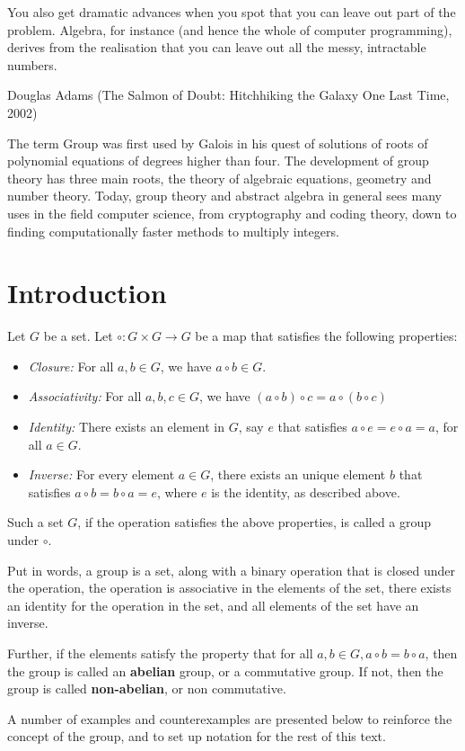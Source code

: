 \epigraph{You also get dramatic advances when you spot that you can leave out part of the problem. Algebra, for instance (and hence the whole of computer programming), derives from the realisation that you can leave out all the messy, intractable numbers.}{Douglas Adams (The Salmon of Doubt: Hitchhiking the Galaxy One Last Time, 2002)}
\par
The term Group was first used by Galois in his quest of solutions of roots of polynomial equations of degrees higher than four.
The development of group theory has three main roots, the theory of algebraic equations, geometry and number theory.
Today, group theory and abstract algebra in general sees many uses in the field computer science, from cryptography and coding theory, down to finding computationally faster methods to multiply integers.
\section{Introduction}
\begin{definition} \label{def:group}
  Let $G$ be a set.
  Let $ \circ : G \times G \rightarrow G $  be a map that satisfies the following properties:
  \begin{itemize}
    \item \textit{Closure:} For all $a, b \in G$, we have $a \circ b \in G$.
    \item \textit{Associativity:} For all $a, b, c \in G$, we have $(a \circ b) \circ c = a \circ (b \circ c)$
    \item \textit{Identity:} There exists an element in $G$, say $e$ that satisfies $a \circ e = e \circ a = a$, for all $a \in G$.
    \item \textit{Inverse:} For every element $a \in G$, there exists an unique element $b$ that satisfies $a \circ b = b \circ a = e$, where $e$ is the identity, as described above.
  \end{itemize}
  Such a set $G$, if the operation satisfies the above properties, is called a group under $\circ$.
\end{definition}
Put in words, a group is a set, along with a binary operation that is closed under the operation, the operation is associative in the elements of the set, there exists an identity for the operation in the set, and all elements of the set have an inverse.
\par
Further, if the elements satisfy the property that for all $a, b \in G, a \circ b = b \circ a$, then the group is called an \textbf{abelian} group, or a commutative group.
If not, then the group is called \textbf{non-abelian}, or non commutative.
\par
A number of examples and counterexamples are presented below to reinforce the concept of the group, and to set up notation for the rest of this text.
